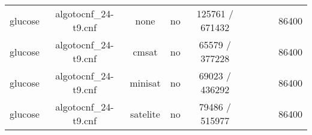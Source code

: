 \begin{appendices}
\begin{table}[p]
\begin{center}
\begin{tabular}{l|cccccccc}
  glucose                        & algotocnf\_24-t9.cnf           & none       & no    & 125761 / 671432 &           &           &            & 86400 \\ %
  glucose                        & algotocnf\_24-t9.cnf           & cmsat      & no    & 65579 / 377228 &           &           &            & 86400 \\ %
  glucose                        & algotocnf\_24-t9.cnf           & minisat    & no    & 69023 / 436292 &           &           &            & 86400 \\ %
  glucose                        & algotocnf\_24-t9.cnf           & satelite   & no    & 79486 / 515977 &           &           &            & 86400 \\ %
    \end{tabular}
  \end{center}
\end{table}

\newpage


\end{appendices}
